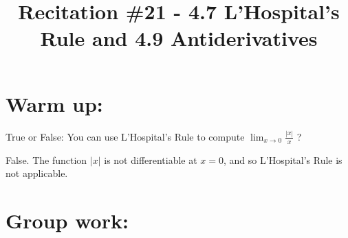 \documentclass[handout,nooutcomes]{ximera}
\title{Recitation \#21 - 4.7 L'Hospital's Rule and 4.9 Antiderivatives}
\begin{document}
\begin{abstract}		\end{abstract}
\maketitle

\section*{Warm up:} 
True or False:  You can use L'Hospital's Rule to compute $\lim_{x \to 0} \frac{|x|}{x}$ ?
		\begin{freeResponse}
		False.  The function $|x|$ is not differentiable at $x=0$, and so L'Hospital's Rule is not applicable.
		\end{freeResponse}	
		
		
		

	
	
	
	
	

\section*{Group work:}
\end{document}
